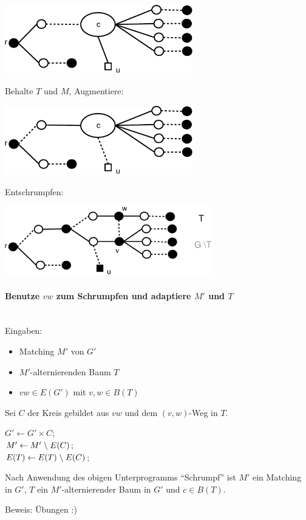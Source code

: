 \includegraphics[height=3cm]{bilder/5-2Bluetenschr2}


Behalte $T$ und $M$, Augmentiere:

\includegraphics[height=3cm]{bilder/5-2Bluetenschr3}

Entschrumpfen:

\includegraphics[height=3cm]{bilder/5-2Bluetenschr4}

\paragraph{Benutze $vw$ zum Schrumpfen und adaptiere $M'$ und $T$}
\mbox{}\\

Eingaben:
\begin{itemize}
\item Matching $M'$ von $G'$
\item $M'$-alternierenden Baum $T$
\item $vw \in E(G')$ mit $v,w \in B(T)$
\end{itemize}
Sei $C$ der Kreis gebildet aus $v w$ und dem $(v,w)$-Weg in $T$.

$G' \leftarrow G' \times C$;\\
$M' \leftarrow M' \;\backslash\; E(C)$;\\
$E(T) \leftarrow E(T) \;\backslash\; E(C)$;

\begin{lemma}
Nach Anwendung des obigen Unterprogramms "`Schrumpf"' ist $M'$ ein Matching
in $G'$, $T$ ein $M'$-alternierender Baum in $G'$ und $c\in B(T)$.
\end{lemma}
Beweis: Übungen :)

